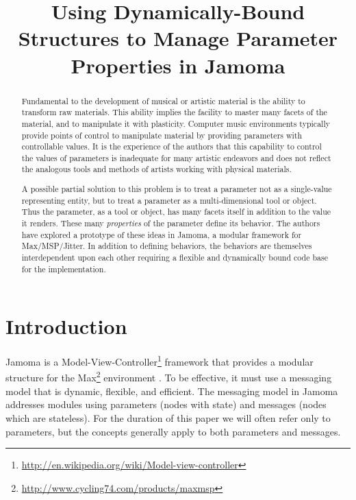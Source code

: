 \documentclass{article}
\title{Using Dynamically-Bound Structures to Manage Parameter Properties in Jamoma}
\begin{document}
%
\maketitle
%
\begin{abstract}

Fundamental to the development of musical or artistic material is the ability to transform raw materials.  This ability implies the facility to master many facets of the material, and to manipulate it with plasticity.  Computer music environments typically provide points of control to manipulate material by providing parameters with controllable values.  It is the experience of the authors that this capability to control the values of parameters is inadequate for many artistic endeavors and does not reflect the analogous tools and methods of artists working with physical materials.  

A possible partial solution to this problem is to treat a parameter not as a single-value representing entity, but to treat a parameter as a multi-dimensional tool or object.  Thus the parameter, as a tool or object, has many facets itself in addition to the value it renders.  These many \emph{properties} of the parameter define its behavior.  The authors have explored a prototype of these ideas in Jamoma, a modular framework for Max/MSP/Jitter.  In addition to defining behaviors, the behaviors are themselves interdependent upon each other requiring a flexible and dynamically bound code base for the implementation.

\end{abstract}


\section{Introduction} %
\label{sec:introduction}

Jamoma is a Model-View-Controller\footnote{\url{http://en.wikipedia.org/wiki/Model-view-controller}} framework that provides a modular structure for the Max\footnote{\url{http://www.cycling74.com/products/maxmsp}} environment \cite{Place:2006}.  To be effective, it must use a messaging model that is dynamic, flexible, and efficient. The messaging model in Jamoma addresses modules using parameters (nodes with state) and messages (nodes which are stateless). For the duration of this paper we will often refer only to parameters, but the concepts generally apply to both parameters and messages.
\end{document}
